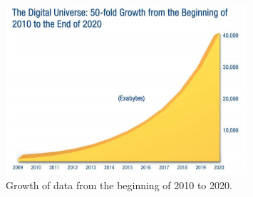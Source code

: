 \begin{figure}[htb]
\centering
\includegraphics[width=0.8\textwidth]{./images/bigData.png}
\caption{Growth of data from the beginning of 2010 to 2020.} 
\label{fig:bigData}
\end{figure}


